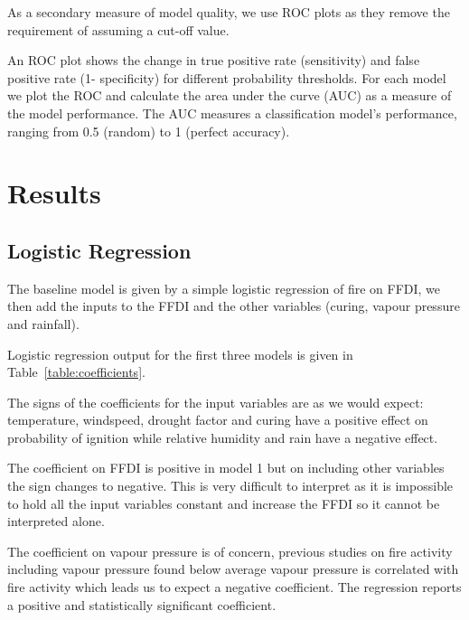 \documentclass[11pt,a4paper]{article}
\begin{document}
As a secondary measure of model quality, we use ROC plots as they remove the requirement of assuming a cut-off value.

An ROC plot shows the change in true positive rate (sensitivity) and false positive rate (1- specificity) for different probability thresholds. For each model we plot the ROC and calculate the area under the curve (AUC) as a measure of the model performance. The AUC measures a classification model's performance, ranging from 0.5 (random) to 1 (perfect accuracy).



\section{Results}

\subsection{Logistic Regression}

The baseline model is given by a simple logistic regression of fire on FFDI, we then add the inputs to the FFDI and  the other variables (curing, vapour pressure and rainfall).

Logistic regression output for the first three models is given in Table~\ref{table:coefficients}.

The signs of the coefficients for the input variables are as we would expect: temperature, windspeed, drought factor and curing have a positive effect on probability of ignition while relative humidity and rain have a negative effect.


The coefficient on FFDI is positive in model 1 but on including other variables the  sign changes to negative. This is very difficult to interpret as it is impossible to hold all the input  variables constant and increase the FFDI so it cannot be interpreted alone.

The coefficient on vapour pressure is of concern, previous studies on fire activity including vapour pressure \citep{harris14} found below average vapour pressure is correlated with fire activity which leads us to expect a negative coefficient. The regression reports a positive and statistically significant coefficient.
\end{document}
